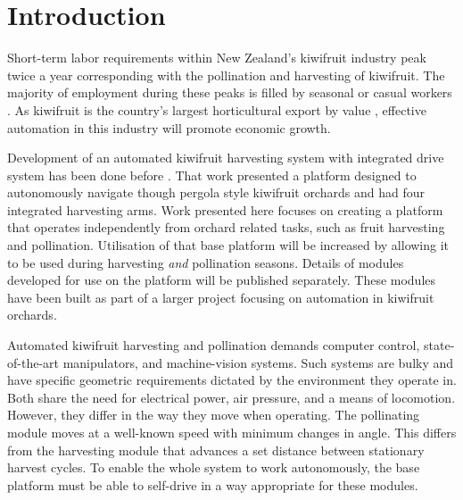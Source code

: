 \documentclass[preprint,authoryear,12pt]{elsarticle}
\begin{document}

\section{Introduction}
\label{sect:intro}
    Short-term labor requirements within New Zealand's kiwifruit industry peak twice a year corresponding with the pollination and harvesting of kiwifruit.
    The majority of employment during these peaks is filled by seasonal or casual workers \citep{Timmins2009}.
    As kiwifruit is the country's largest horticultural export by value \citep{StatisticsNewZealand2015}, effective automation in this industry will promote economic growth.

    Development of an automated kiwifruit harvesting system with integrated drive system has been done before \citep{Scarfe2012}.
    That work presented a platform designed to autonomously navigate though pergola style kiwifruit orchards and had four integrated harvesting arms.
    Work presented here focuses on creating a platform that operates independently from orchard related tasks, such as fruit harvesting and pollination.
    Utilisation of that base platform will be increased by allowing it to be used during harvesting \emph{and} pollination seasons.
    Details of modules developed for use on the platform will be published separately.
    These modules have been built as part of a larger project focusing on automation in kiwifruit orchards.

    Automated kiwifruit harvesting and pollination demands computer control, state-of-the-art manipulators, and machine-vision systems.
    Such systems are bulky and have specific geometric requirements dictated by the environment they operate in.
    Both share the need for electrical power, air pressure, and a means of locomotion.
    However, they differ in the way they move when operating.
    The pollinating module moves at a well-known speed with minimum changes in angle.
    This differs from the harvesting module that advances a set distance between stationary harvest cycles.
    To enable the whole system to work autonomously, the base platform must be able to self-drive in a way appropriate for these modules.
\end{document}
